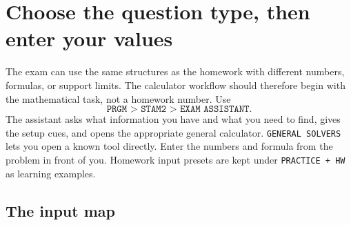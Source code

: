 \section{Choose the question type, then enter your values}
The exam can use the same structures as the homework with different numbers, formulas, or support limits. The calculator workflow should therefore begin with the mathematical task, not a homework number. Use
\[
\texttt{PRGM > STAM2 > EXAM ASSISTANT}.
\]
The assistant asks what information you have and what you need to find, gives the setup cues, and opens the appropriate general calculator. \texttt{GENERAL SOLVERS} lets you open a known tool directly. Enter the numbers and formula from the problem in front of you. Homework input presets are kept under \texttt{PRACTICE + HW} as learning examples.

\subsection{The input map}
